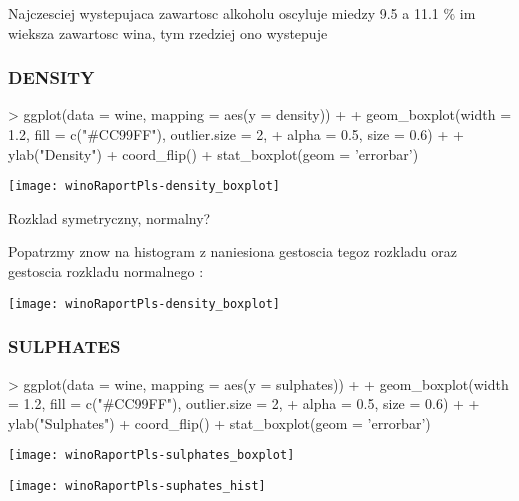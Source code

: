 \documentclass{article}
\begin{document}
Najczesciej wystepujaca zawartosc alkoholu oscyluje miedzy 9.5 a 11.1 $\%$
im wieksza zawartosc wina, tym rzedziej ono wystepuje


\subsubsection{DENSITY}

\begin{Schunk}
\begin{Sinput}
> ggplot(data = wine, mapping = aes(y = density)) + 
+   geom_boxplot(width = 1.2, fill = c("#CC99FF"), outlier.size = 2, 
+                alpha = 0.5, size = 0.6) +
+   ylab("Density") + coord_flip() + stat_boxplot(geom = 'errorbar')
\end{Sinput}
\end{Schunk}
\texttt{[image: winoRaportPls-density\_boxplot]}

Rozklad symetryczny, normalny?

Popatrzmy znow na histogram z naniesiona gestoscia tegoz rozkladu oraz gestoscia rozkladu normalnego :

\begin{Schunk}
\end{Schunk}
\texttt{[image: winoRaportPls-density\_boxplot]}

\subsubsection{SULPHATES}

\begin{Schunk}
\begin{Sinput}
> ggplot(data = wine, mapping = aes(y = sulphates)) + 
+   geom_boxplot(width = 1.2, fill = c("#CC99FF"), outlier.size = 2, 
+                alpha = 0.5, size = 0.6) +
+   ylab("Sulphates") + coord_flip() + stat_boxplot(geom = 'errorbar')
\end{Sinput}
\end{Schunk}
\texttt{[image: winoRaportPls-sulphates\_boxplot]}


\begin{Schunk}
\end{Schunk}
\texttt{[image: winoRaportPls-suphates\_hist]}
\end{document}
